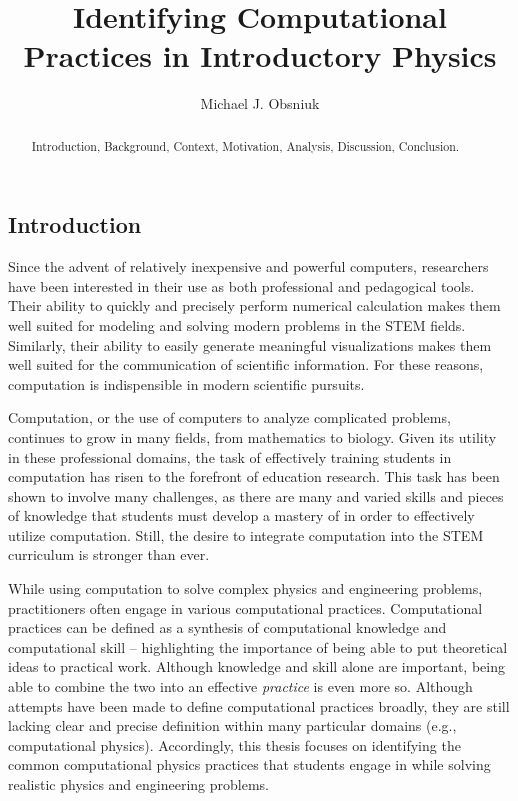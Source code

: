 \documentclass{msuphddissertation}
\author{Michael J. Obsniuk}
\title{Identifying Computational Practices in Introductory Physics}
\begin{document}
\maketitlepage

\begin{abstract}
Introduction, Background, Context, Motivation, Analysis, Discussion, Conclusion.
\end{abstract}

\TOC
\LOT
\LOF

\newpage
{}
\begin{doublespace}

%
%
%
%
%
%
%
%
%
%
%
%
%
%
%
%

\chapter{Introduction}\label{CH1:Introduction}

Since the advent of relatively inexpensive and powerful computers, researchers have been interested in their use as both professional and pedagogical tools.  Their ability to quickly and precisely perform numerical calculation makes them well suited for modeling and solving modern problems in the STEM fields.  Similarly, their ability to easily generate meaningful visualizations makes them well suited for the communication of scientific information.  For these reasons, computation is indispensible in modern scientific pursuits.

Computation, or the use of computers to analyze complicated problems, continues to grow in many fields, from mathematics to biology.  Given its utility in these professional domains, the task of effectively training students in computation has risen to the forefront of education research.  This task has been shown to involve many challenges, as there are many and varied skills and pieces of knowledge that students must develop a mastery of in order to effectively utilize computation.  Still, the desire to integrate computation into the STEM curriculum is stronger than ever.

While using computation to solve complex physics and engineering problems, practitioners often engage in various computational practices.  Computational practices can be defined as a synthesis of computational knowledge and computational skill -- highlighting the importance of being able to put theoretical ideas to practical work.  Although knowledge and skill alone are important, being able to combine the two into an effective \textit{practice} is even more so.  Although attempts have been made to define computational practices broadly, they are still lacking clear and precise definition within many particular domains (e.g., computational physics). Accordingly, this thesis focuses on identifying the common computational physics practices that students engage in while solving realistic physics and engineering problems.


\end{doublespace}
\end{document}
